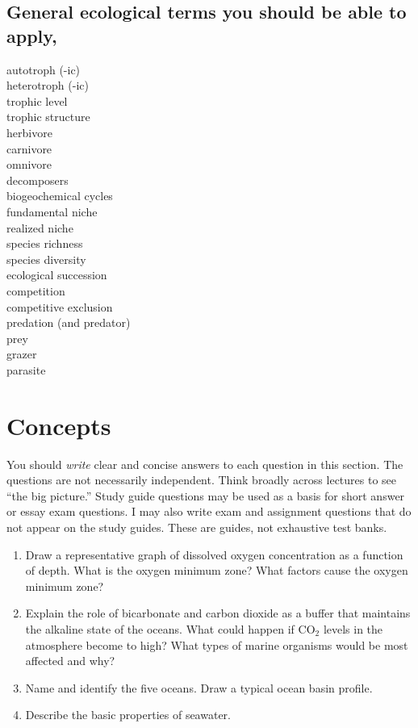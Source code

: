 \documentclass[nofonts, letterpaper]{tufte-handout}
\begin{document}
\subsection*{General ecological terms you should be able to apply,}
\begin{multicols}{2}
autotroph (-ic) \\
heterotroph (-ic) \\
trophic level \\
trophic structure \\
herbivore \\
carnivore \\
omnivore \\
decomposers \\
biogeochemical cycles \\
fundamental niche \\
realized niche \\
species richness \\
species diversity \\
ecological succession \\
competition \\
competitive exclusion \\
predation (and predator) \\
prey \\
grazer \\
parasite
\end{multicols}


\section{Concepts}

You should \emph{write} clear and concise answers to each question in this section.  The questions are not necessarily independent.  Think broadly across lectures to see ``the big picture.''  Study guide questions may be used as a basis for short answer or essay exam questions. I may also write exam and assignment questions that do not appear on the study guides. These are guides, not exhaustive test banks.

\begin{enumerate}
	\item Draw a representative graph of dissolved oxygen concentration as a function of depth.  What is the oxygen minimum zone? What factors cause the oxygen minimum zone?

	\item Explain the role of bicarbonate and carbon dioxide as a buffer that maintains the alkaline state of the oceans.  What could happen if CO$_2$ levels in the atmosphere become to high?  What types of marine organisms would be most affected and why?

	\item Name and identify the five oceans.  Draw a typical ocean basin profile.

	\item Describe the basic properties of seawater.

\end{enumerate}
\end{document}

